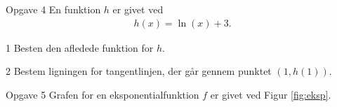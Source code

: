 \documentclass[12pt,x11names,a4paper]{article}
\begin{document}
\begin{opgavetekst}{Opgave 4}
	En funktion $h$ er givet ved
	\begin{align*}
		h(x) = \ln(x) + 3.
	\end{align*}
\end{opgavetekst}

\begin{delopgave}{}{1}
	Besten den afledede funktion for $h$. 
\end{delopgave}
\begin{delopgave}{}{2}
	Bestem ligningen for tangentlinjen, der går gennem punktet $(1,h(1))$.
\end{delopgave}

\begin{opgavetekst}{Opgave 5}
	Grafen for en eksponentialfunktion $f$ er givet ved Figur \ref{fig:eksp}.
	\begin{figure}[H]
	\end{figure}
	\phantom{h}
\end{opgavetekst}
\end{document}
